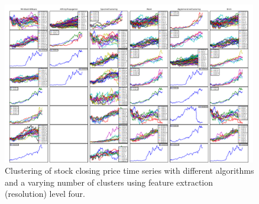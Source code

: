 \documentclass{article}
\begin{document}
\begin{figure}
\includegraphics[width=0.99\textwidth]{../demo/CompleteGrid.pdf}
\caption{Clustering of stock closing price time series with different algorithms and a varying number of clusters using feature extraction (resolution) level four.}
\end{figure}
\end{document}
